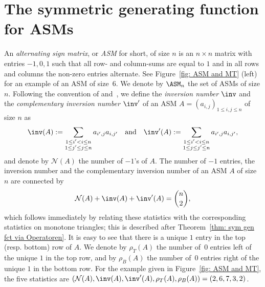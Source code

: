 \section{The symmetric generating function for ASMs}
\label{sec: ASM gen fct}

An \emph{alternating sign matrix}, or \emph{ASM} for short, of size $n$ is an $n \times n$ matrix with entries $-1,0,1$ such that all row- and column-sums are equal to $1$ and in all rows and columns the non-zero entries alternate. See Figure~\ref{fig: ASM and MT} (left) for an example of an ASM of size~$6$. We denote by $\ASM_n$ the set of ASMs of size $n$. 
Following the convention of \cite[Eq. 18]{RobbinsRumsey86} and~\cite{Fischer18}, we define the \emph{inversion number} $\inv$ and the \emph{complementary inversion number} $\inv^\prime$ of an ASM $A=(a_{i,j})_{1 \leq i,j \leq n}$ of size $n$ as
\[
\inv(A):= \sum_{\substack{1 \leq i^\prime < i \leq n \\ 1 \leq j^\prime \leq j \leq n}}a_{i^\prime, j}a_{i,j^\prime} \quad \text{and} \quad
\inv^\prime(A):= \sum_{\substack{1 \leq i^\prime < i \leq n \\ 1 \leq j \leq j^\prime \leq n}}a_{i^\prime, j}a_{i,j^\prime},
\]
and denote by $\mathcal{N}(A)$ the number of $-1$'s of $A$.  The number of $-1$ entries, the inversion number and the complementary inversion number of an ASM $A$ of size $n$ are connected by
\[
\mathcal{N}(A)+\inv(A)+\inv^\prime(A)=\binom{n}{2},
\]
which follows immediately by relating these statistics with the corresponding statistics on monotone triangles; this is described after Theorem~\ref{thm: sym gen fct via Operatoren}.
It is easy to see that there is a unique $1$ entry in the top (resp. bottom) row of $A$. We denote by $\rho_T(A)$ the number of~$0$ entries left of the unique $1$ in the top row, and by $\rho_B(A)$ the number of~$0$ entries right of the unique $1$ in the bottom row.
For the example given in Figure~\ref{fig: ASM and MT}, the five statistics are $(\mathcal{N}(A),\inv(A),\inv^\prime(A),\rho_T(A),\rho_B(A))=(2,6,7,3,2)$.
